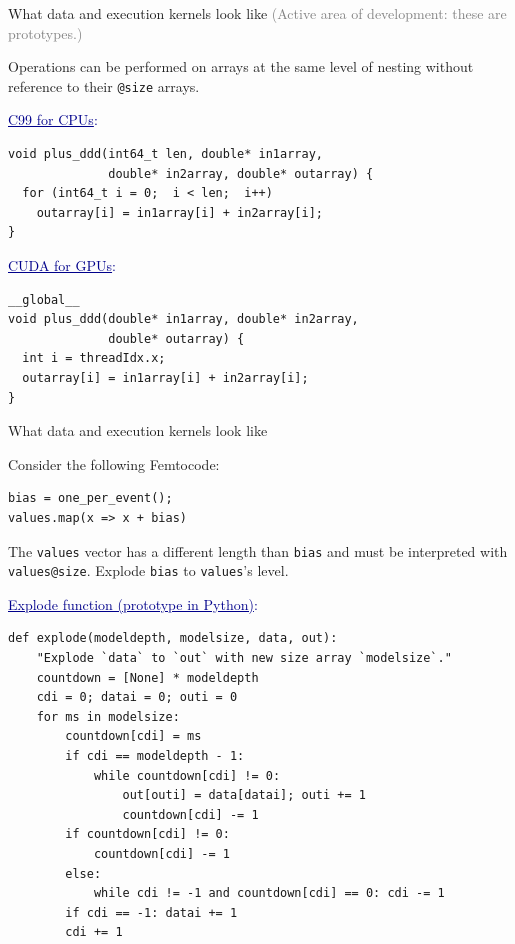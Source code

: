 \documentclass{beamer}
\begin{document}
\begin{frame}[fragile]{What data and execution kernels look like}
\vspace{0.5 cm}
\textcolor{gray}{(Active area of development: these are prototypes.)}
\small

\vspace{0.25 cm}
Operations can be performed on arrays at the same level of nesting without reference to their {\tt @size} arrays.

\vspace{0.25 cm}
\textcolor{darkblue}{\normalsize \underline{C99 for CPUs}:}
\vspace{-0.1 cm}
\begin{verbatim}
void plus_ddd(int64_t len, double* in1array,
              double* in2array, double* outarray) {
  for (int64_t i = 0;  i < len;  i++)
    outarray[i] = in1array[i] + in2array[i];
}
\end{verbatim}

\vspace{0.25 cm}
\textcolor{darkblue}{\normalsize \underline{CUDA for GPUs}:}
\vspace{-0.1 cm}
\begin{verbatim}
__global__
void plus_ddd(double* in1array, double* in2array,
              double* outarray) {
  int i = threadIdx.x;
  outarray[i] = in1array[i] + in2array[i];
}
\end{verbatim}
\end{frame}

\begin{frame}[fragile]{What data and execution kernels look like}
\scriptsize

\vspace{0.25 cm}
Consider the following Femtocode:
\begin{center}
\begin{minipage}{0.5\linewidth}
\begin{verbatim}
bias = one_per_event();
values.map(x => x + bias)
\end{verbatim}
\end{minipage}
\end{center}

The {\tt values} vector has a different length than {\tt bias} and must be interpreted with {\tt values@size}. Explode {\tt bias} to {\tt values}'s level.

\vspace{0.25 cm}
\textcolor{darkblue}{\small \underline{Explode function (prototype in Python)}:}
\begin{verbatim}
def explode(modeldepth, modelsize, data, out):
    "Explode `data` to `out` with new size array `modelsize`."
    countdown = [None] * modeldepth
    cdi = 0; datai = 0; outi = 0
    for ms in modelsize:
        countdown[cdi] = ms
        if cdi == modeldepth - 1:
            while countdown[cdi] != 0:
                out[outi] = data[datai]; outi += 1
                countdown[cdi] -= 1
        if countdown[cdi] != 0:
            countdown[cdi] -= 1
        else:
            while cdi != -1 and countdown[cdi] == 0: cdi -= 1
        if cdi == -1: datai += 1
        cdi += 1
\end{verbatim}
\end{frame}
\end{document}
